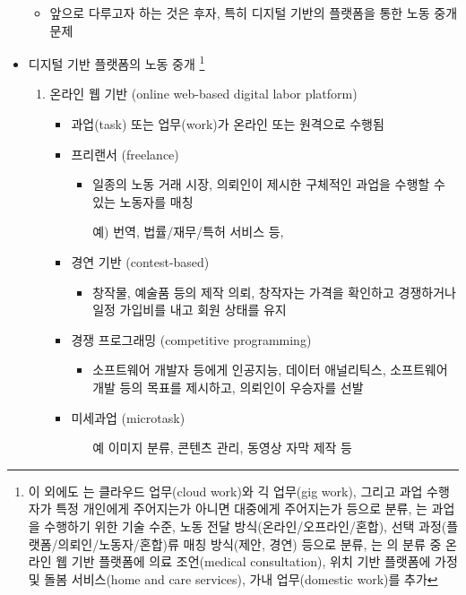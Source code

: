 \begin{itemize}
\begin{itemize}
	\item 앞으로 다루고자 하는 것은 후자, 특히 디지털 기반의 플랫폼을 통한 노동 중개 문제
	\end{itemize}
\item 디지털 기반 플랫폼의 노동 중개 \citep{International-Labour-Office:2021uk}	 \footnote{이 외에도 \cite{Schmidt:2017ws}는 클라우드 업무(cloud work)와 긱 업무(gig work), 그리고 과업 수행자가 특정 개인에게 주어지는가 아니면 대중에게 주어지는가 등으로 분류, \cite{Fernandez-Macias:2018wq}는 과업을 수행하기 위한 기술 수준, 노동 전달 방식(온라인/오프라인/혼합), 선택 과정(플랫폼/의뢰인/노동자/혼합)류 매칭 방식(제안, 경연) 등으로 분류, \cite{Groen:2021uc}는 \cite{International-Labour-Office:2021uk}의 분류 중 온라인 웹 기반 플랫폼에 의료 조언(medical consultation), 위치 기반 플랫폼에 가정 및 돌봄 서비스(home and care services), 가내 업무(domestic work)를 추가}
	\begin{enumerate}
	\item 온라인 웹 기반 (online web-based digital labor platform)
		\begin{itemize}
		\item 과업(task) 또는 업무(work)가 온라인 또는 원격으로 수행됨
		\item 프리랜서 (freelance)
			\begin{itemize}
			\item 일종의 노동 거래 시장, 의뢰인이 제시한 구체적인 과업을 수행할 수 있는 노동자를 매칭
			\item[예)] 번역, 법률/재무/특허 서비스 등, 
			\end{itemize}	
		\item 경연 기반 (contest-based)
			\begin{itemize}
			\item 창작물, 예술품 등의 제작 의뢰, 창작자는 가격을 확인하고 경쟁하거나 일정 가입비를 내고 회원 상태를 유지
			\end{itemize}
		\item 경쟁 프로그래밍 (competitive programming)
			\begin{itemize}
			\item 소프트웨어 개발자 등에게 인공지능, 데이터 애널리틱스, 소프트웨어 개발 등의 목표를 제시하고, 의뢰인이 우승자를 선발
			\end{itemize}
		\item 미세과업 (microtask)
			\begin{itemize}
			\item[예] 이미지 분류, 콘텐츠 관리, 동영상 자막 제작 등
			\end{itemize}

\end{itemize}
\end{enumerate}
\end{itemize}
